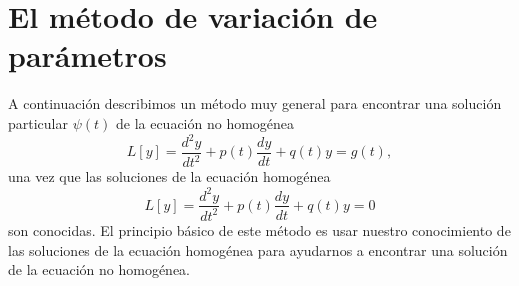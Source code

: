 \documentclass[12pt]{article}
\begin{document}
\section{El método de variación de parámetros}
A continuación describimos un método muy general para encontrar una solución particular $\psi(t)$ 
de la ecuación no homogénea
\begin{equation}
L[y]=\frac{d^{2}y}{dt^{2}}+p(t)\frac{dy}{dt}+q(t)y=g(t),
\label{Ecu01}
\end{equation}
una vez que las soluciones de la ecuación homogénea
\begin{equation}
L[y]=\frac{d^{2}y}{dt^{2}}+p(t)\frac{dy}{dt}+q(t)y=0
\label{Ecu02}
\end{equation}
son conocidas. El principio básico de este método es usar nuestro conocimiento de las soluciones 
de la ecuación homogénea para ayudarnos a encontrar una solución de la ecuación no homogénea.
\end{document}
